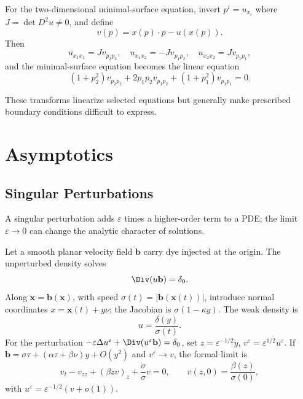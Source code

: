 \begin{example}
\label{ex:legendre-transform-minimal-surface}
For the two-dimensional minimal-surface equation, invert
$p^i=u_{x_i}$ where $J=\det D^2u\ne0$, and define
\[
v(p)=x(p)\cdot p-u(x(p)).
\]
Then
\[
u_{x_1x_1}=Jv_{p_2p_2},\quad u_{x_1x_2}=-Jv_{p_1p_2},\quad
u_{x_2x_2}=Jv_{p_1p_1},
\]
and the minimal-surface equation becomes the linear equation
\[
(1+p_2^2)v_{p_2p_2}+2p_1p_2v_{p_1p_2}+(1+p_1^2)v_{p_1p_1}=0.
\]
\end{example}

\begin{remark}
\label{rem:hodograph-legendre-practical-difficulty}
These transforms linearize selected equations but generally make prescribed
boundary conditions difficult to express.
\end{remark}

\section{Asymptotics}
\label{sec:asymptotics}

\subsection{Singular Perturbations}
\label{sec:singular-perturbations}

\begin{definition}
\label{def:singular-perturbation}
A singular perturbation adds $\varepsilon$ times a higher-order term to a PDE;
the limit $\varepsilon\to0$ can change the analytic character of solutions.
\end{definition}

\begin{example}
\label{ex:transport-small-diffusion-singular-perturbation}
Let a smooth planar velocity field $\mathbf b$ carry dye injected at the
origin. The unperturbed density solves
\[
\Div(u\mathbf b)=\delta_0.
\]
Along $\dot{\mathbf x}=\mathbf b(\mathbf x)$, with speed
$\sigma(t)=|\mathbf b(\mathbf x(t))|$, introduce normal coordinates
$x=\mathbf x(t)+y\nu$; the Jacobian is $\sigma(1-\kappa y)$. The weak density is
\[
u=\frac{\delta(y)}{\sigma(t)}.
\]
For the perturbation $-\varepsilon\Delta u^\varepsilon+\Div(u^\varepsilon\mathbf b)=\delta_0$,
set $z=\varepsilon^{-1/2}y$, $v^\varepsilon=\varepsilon^{1/2}u^\varepsilon$.
If
$\mathbf b=\sigma\tau+(\alpha\tau+\beta\nu)y+O(y^2)$ and
$v^\varepsilon\to v$, the formal limit is
\[
v_t-v_{zz}+(\beta zv)_z+\frac{\dot\sigma}{\sigma}v=0,
\qquad
v(z,0)=\frac{\beta(z)}{\sigma(0)},
\]
with $u^\varepsilon=\varepsilon^{-1/2}(v+o(1))$.
\end{example}

